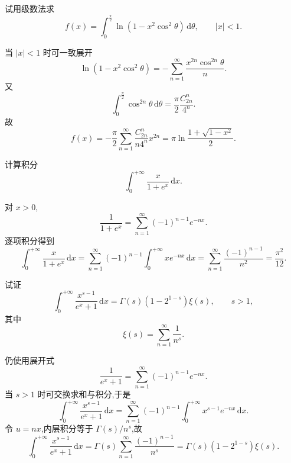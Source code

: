 \begin{example}
    试用级数法求
    \[
        f(x)=\int_0^{\frac{\pi}{2}}\ln(1-x^2\cos^2\theta)\,\mathrm{d}\theta,
        \qquad |x|<1.
    \]
\end{example}
\exampleblank

\begin{solution}
    当 $|x|<1$ 时可一致展开
    \[
        \ln(1-x^2\cos^2\theta)
        =-\sum\limits_{n=1}^{\infty}\dfrac{x^{2n}\cos^{2n}\theta}{n}.
    \]
    又
    \[
        \displaystyle\int_0^{\frac{\pi}{2}}\cos^{2n}\theta\,\mathrm{d}\theta
        =\dfrac{\pi}{2}\dfrac{C_{2n}^n}{4^n}.
    \]
    故
    \[
        f(x)=-\dfrac{\pi}{2}\sum\limits_{n=1}^{\infty}
        \dfrac{C_{2n}^n}{n4^n}x^{2n}
        =\pi\ln\dfrac{1+\sqrt{1-x^2}}{2}.
    \]
\end{solution}

\begin{example}
    计算积分
    \[
        \displaystyle\int_0^{+\infty}\dfrac{x}{1+e^x}\,\mathrm{d}x.
    \]
\end{example}
\exampleblank

\begin{solution}
    对 $x>0$,
    \[
        \dfrac{1}{1+e^x}=\sum\limits_{n=1}^{\infty}(-1)^{n-1}e^{-nx}.
    \]
    逐项积分得到
    \[
        \displaystyle\int_0^{+\infty}\dfrac{x}{1+e^x}\,\mathrm{d}x
        =\sum\limits_{n=1}^{\infty}(-1)^{n-1}\int_0^{+\infty}xe^{-nx}\,\mathrm{d}x
        =\sum\limits_{n=1}^{\infty}\dfrac{(-1)^{n-1}}{n^2}
        =\dfrac{\pi^2}{12}.
    \]
\end{solution}

\begin{example}[\markstar]
    试证
    \[
        \displaystyle\int_0^{+\infty}\dfrac{x^{s-1}}{e^x+1}\,\mathrm{d}x
        =\Gamma(s)(1-2^{1-s})\xi(s),\qquad s>1,
    \]
    其中
    \[
        \xi(s)=\sum\limits_{n=1}^{\infty}\dfrac{1}{n^s}.
    \]
\end{example}
\exampleblank

\begin{solution}
    仍使用展开式
    \[
        \dfrac{1}{e^x+1}=\sum\limits_{n=1}^{\infty}(-1)^{n-1}e^{-nx}.
    \]
    当 $s>1$ 时可交换求和与积分,于是
    \[
        \displaystyle\int_0^{+\infty}\dfrac{x^{s-1}}{e^x+1}\,\mathrm{d}x
        =\sum\limits_{n=1}^{\infty}(-1)^{n-1}
        \int_0^{+\infty}x^{s-1}e^{-nx}\,\mathrm{d}x.
    \]
    令 $u=nx$,内层积分等于 $\Gamma(s)/n^s$,故
    \[
        \displaystyle\int_0^{+\infty}\dfrac{x^{s-1}}{e^x+1}\,\mathrm{d}x
        =\Gamma(s)\sum\limits_{n=1}^{\infty}\dfrac{(-1)^{n-1}}{n^s}
        =\Gamma(s)(1-2^{1-s})\xi(s).
    \]
\end{solution}


